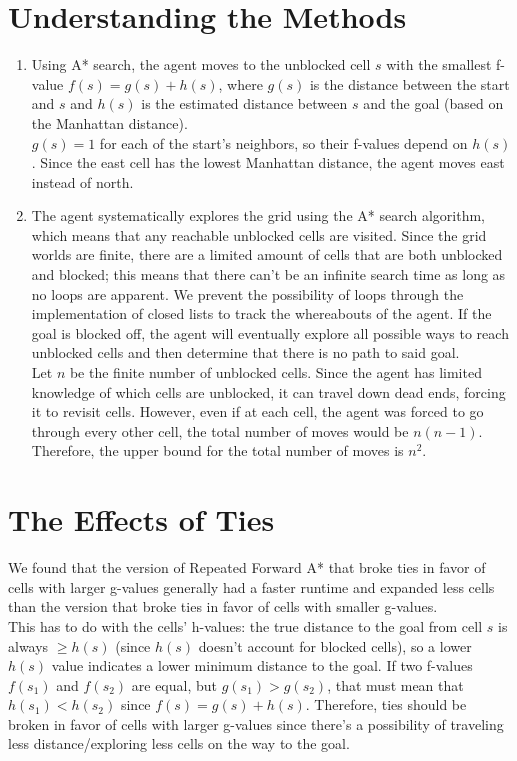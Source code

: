 \documentclass{article}
\begin{document}
\section{Understanding the Methods}
\begin{enumerate}[label = \alph*)]
    \item Using A* search, the agent moves to the unblocked cell $s$ with the smallest f-value $f(s) = g(s) + h(s)$, where $g(s)$ is the distance between the start and $s$ and $h(s)$ is the estimated distance between $s$ and the goal (based on the Manhattan distance).\\ 
    $g(s) = 1$ for each of the start's neighbors, so their f-values depend on $h(s)$. Since the east cell has the lowest Manhattan distance, the agent moves east instead of north. 
    \item The agent systematically explores the grid using the A* search algorithm, which means that any reachable unblocked cells are visited. Since the grid worlds are finite, there are a limited amount of cells that are both unblocked and blocked; this means that there can’t be an infinite search time as long as no loops are apparent. We prevent the possibility of loops through the implementation of closed lists to track the whereabouts of the agent. If the goal is blocked off, the agent will eventually explore all possible ways to reach unblocked cells and then determine that there is no path to said goal.\\
    Let $n$ be the finite number of unblocked cells. Since the agent has limited knowledge of which cells are unblocked, it can travel down dead ends, forcing it to revisit cells. However, even if at each cell, the agent was forced to go through every other cell, the total number of moves would be $n(n-1)$. Therefore, the upper bound for the total number of moves is $n^2$. 
\end{enumerate}

\section{The Effects of Ties}
We found that the version of Repeated Forward A* that broke ties in favor of cells with larger g-values generally had a faster runtime and expanded less cells than the version that broke ties in favor of cells with smaller g-values.\\
This has to do with the cells' h-values: the true distance to the goal from cell $s$ is always $\ge h(s)$ (since $h(s)$ doesn't account for blocked cells), so a lower $h(s)$ value indicates a lower minimum distance to the goal. If two f-values $f(s_1)$ and $f(s_2)$ are equal, but $g(s_1) > g(s_2)$, that must mean that $h(s_1) < h(s_2)$ since $f(s) = g(s) + h(s)$. Therefore, ties should be broken in favor of cells with larger g-values since there's a possibility of traveling less distance/exploring less cells on the way to the goal.
\end{document}
